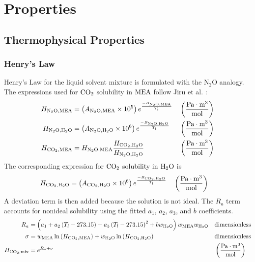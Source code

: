     \vspace{1cm}
    \section{Properties}\label{sec:properties}
        \vspace{1cm}
        \subsection{Thermophysical Properties}
            \vspace{1cm}
            \subsubsection{Henry's Law} 
                Henry's Law for the liquid solvent mixture is formulated with the N$_2$O analogy. The expressions used for $\COtwo$ solubility in $\MEA$ follow Jiru et al. \cite{Jiru2012}:
                \begin{align}
                    H_{\NtwoO,\MEA} &= \left(A_{\NtwoO,\MEA} \times 10^5\right) e^{\frac{-B_{\NtwoO,\MEA}}{T_l}} && \left(\frac{\unit{Pa} \cdot \unit{m}^3}{\unit{mol}} \right)\\
                    H_{\NtwoO,\HtwoO} &= \left(A_{\NtwoO,\HtwoO} \times 10^6\right) e^{\frac{-B_{\NtwoO,\HtwoO}}{T_l}} && \left(\frac{\unit{Pa} \cdot \unit{m}^3}{\unit{mol}} \right)\\
                    H_{\COtwo,\MEA} &= H_{\NtwoO,\MEA} \frac{H_{\COtwo, \HtwoO}}{H_{\NtwoO,\HtwoO}} && \left(\frac{\unit{Pa} \cdot \unit{m}^3}{\unit{mol}} \right)
                \end{align}
                The corresponding expression for $\COtwo$ solubility in $\HtwoO$ is
                \begin{align}
                    H_{\COtwo, \HtwoO} &= \left(A_{\COtwo, \HtwoO} \times 10^6\right) e^{\frac{-B_{\COtwo, \HtwoO}}{T_l}} && \left(\frac{\unit{Pa} \cdot \unit{m}^3}{\unit{mol}} \right)
                \end{align}
                A deviation term is then added because the solution is not ideal. The $R_a$ term accounts for nonideal solubility using the fitted $a_1$, $a_2$, $a_3$, and $b$ coefficients.
                \begin{align}
                    R_{a} &= \left(a_1+a_2 \left(T_l-273.15\right)+a_3 \left(T_l-273.15\right)^2+b w_{\HtwoO}\right) w_{\MEA} w_{\HtwoO}
                    && \text{dimensionless}\\
                    \sigma &= w_{\MEA} \ln\left(H_{\COtwo,\MEA}\right)+w_{\HtwoO} \ln\left(H_{\COtwo,\HtwoO}\right)
                    && \text{dimensionless}\\
                    H_{\COtwo,\text{mix}} &= e^{R_{a} + \sigma} && \left(\frac{\unit{Pa} \cdot \unit{m}^3}{\unit{mol}} \right)
                \end{align}


